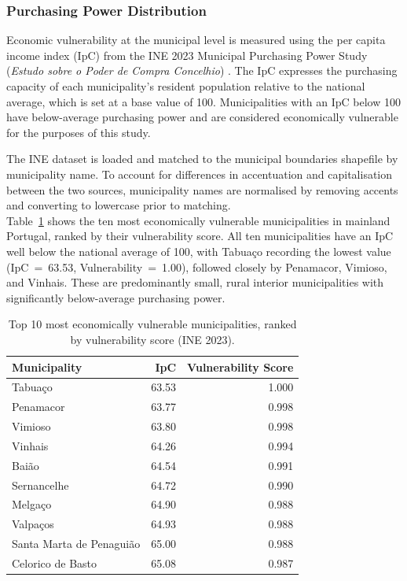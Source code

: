 \subsubsection*{Purchasing Power Distribution}

Economic vulnerability at the municipal level is measured using the
per capita income index (IpC) from the INE 2023 Municipal Purchasing
Power Study (\textit{Estudo sobre o Poder de Compra Concelhio})
\cite{INE_PoderCompra}. The IpC expresses the purchasing capacity of
each municipality's resident population relative to the national
average, which is set at a base value of 100. Municipalities with an
IpC below 100 have below-average purchasing power and are considered
economically vulnerable for the purposes of this study.

The INE dataset is loaded and matched to the municipal boundaries
shapefile by municipality name. To account for differences in
accentuation and capitalisation between the two sources, municipality
names are normalised by removing accents and converting to lowercase
prior to matching.\\

Table~\ref{tab:vulnerability_top10} shows the ten most economically
vulnerable municipalities in mainland Portugal, ranked by their
vulnerability score. All ten municipalities have an IpC well below
the national average of 100, with Tabuaço recording the lowest
value (IpC~=~63.53, Vulnerability~=~1.00), followed closely by
Penamacor, Vimioso, and Vinhais. These are predominantly small,
rural interior municipalities with significantly below-average
purchasing power.

\begin{table}[H]
\centering
\caption{Top 10 most economically vulnerable municipalities,
ranked by vulnerability score (INE 2023).}
\label{tab:vulnerability_top10}
\begin{tabular}{lrr}
\hline
\textbf{Municipality} & \textbf{IpC} & \textbf{Vulnerability Score} \\
\hline
Tabuaço                  & 63.53 & 1.000 \\
Penamacor                & 63.77 & 0.998 \\
Vimioso                  & 63.80 & 0.998 \\
Vinhais                  & 64.26 & 0.994 \\
Baião                    & 64.54 & 0.991 \\
Sernancelhe              & 64.72 & 0.990 \\
Melgaço                  & 64.90 & 0.988 \\
Valpaços                 & 64.93 & 0.988 \\
Santa Marta de Penaguião & 65.00 & 0.988 \\
Celorico de Basto        & 65.08 & 0.987 \\
\hline
\end{tabular}
\end{table}

